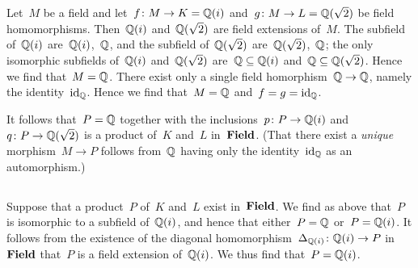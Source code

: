 \section{}





\subsection{}

Let~$M$ be a field and let~$f \colon M \to K = \mathbb{Q}(i)$ and~$g \colon M \to L = \mathbb{Q}(\sqrt{2})$ be field homomorphisms.
Then~$\mathbb{Q}(i)$ and~$\mathbb{Q}(\sqrt{2})$ are field extensions of~$M$.
The subfield of~$\mathbb{Q}(i)$ are~$\mathbb{Q}(i)$,~$\mathbb{Q}$, and the subfield of~$\mathbb{Q}(\sqrt{2})$ are~$\mathbb{Q}(\sqrt{2})$,~$\mathbb{Q}$;
the only isomorphic subfields of~$\mathbb{Q}(i)$ and~$\mathbb{Q}(\sqrt{2})$ are~$\mathbb{Q} \subseteq \mathbb{Q}(i)$ and~$\mathbb{Q} \subseteq \mathbb{Q}(\sqrt{2})$.
Hence we find that~$M = \mathbb{Q}$.
There exist only a single field homorphism~$\mathbb{Q} \to \mathbb{Q}$, namely the identity~$\operatorname{id}_{\mathbb{Q}}$.
Hence we find that~$M = \mathbb{Q}$ and~$f = g = \operatorname{id}_{\mathbb{Q}}$.

It follows that~$P = \mathbb{Q}$ together with the inclusions~$p \colon P \to \mathbb{Q}(i)$ and~$q \colon P \to \mathbb{Q}(\sqrt{2})$ is a product of~$K$ and~$L$ in~$\mathbf{Field}$.
(That there exist a \emph{unique} morphism~$M \to P$ follows from~$\mathbb{Q}$ having only the identity~$\operatorname{id}_{\mathbb{Q}}$ as an automorphism.)





\subsection{}

Suppose that a product~$P$ of~$K$ and~$L$ exist in~$\mathbf{Field}$.
We find as above that~$P$ is isomorphic to a subfield of~$\mathbb{Q}(i)$, and hence that either~$P = \mathbb{Q}$ or~$P = \mathbb{Q}(i)$.
It follows from the existence of the diagonal homomorphism~$\Delta_{\mathbb{Q}(i)} \colon \mathbb{Q}(i) \to P$ in~$\mathbf{Field}$ that~$P$ is a field extension of~$\mathbb{Q}(i)$.
We thus find that~$P = \mathbb{Q}(i)$.

